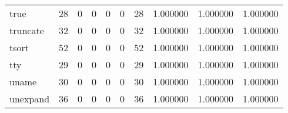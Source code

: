 \begin{longtable}{lrrrrrrrrr}
true      &                                        28 &                                                  0 &                                                  0 &                                                  0 &                                                  0 &                                                 28 &                                           1.000000 &                               1.000000 &                             1.000000 \\
truncate  &                                        32 &                                                  0 &                                                  0 &                                                  0 &                                                  0 &                                                 32 &                                           1.000000 &                               1.000000 &                             1.000000 \\
tsort     &                                        52 &                                                  0 &                                                  0 &                                                  0 &                                                  0 &                                                 52 &                                           1.000000 &                               1.000000 &                             1.000000 \\
tty       &                                        29 &                                                  0 &                                                  0 &                                                  0 &                                                  0 &                                                 29 &                                           1.000000 &                               1.000000 &                             1.000000 \\
uname     &                                        30 &                                                  0 &                                                  0 &                                                  0 &                                                  0 &                                                 30 &                                           1.000000 &                               1.000000 &                             1.000000 \\
unexpand  &                                        36 &                                                  0 &                                                  0 &                                                  0 &                                                  0 &                                                 36 &                                           1.000000 &                               1.000000 &                             1.000000 \\

\end{longtable}
